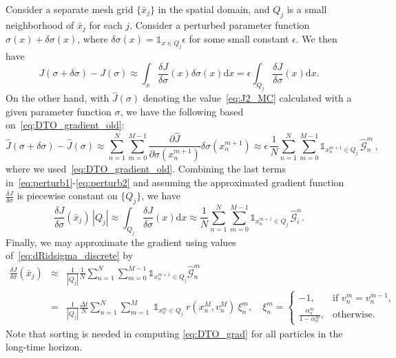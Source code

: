 \documentclass[12pt]{amsart}
\newcommand{\rd}{\mathrm{d}}
\begin{document}
Consider a separate mesh grid $\{\bar{x}_j\}$ in the spatial domain, and $Q_j$ is a small neighborhood of $\bar{x}_j$ for each $j$. Consider a perturbed parameter function $\sigma(x) + \delta \sigma(x)$, where $\delta \sigma(x) = \mathds{1}_{x \in Q_j}  \epsilon$ for some small constant $\epsilon$. We then have
\begin{equation}\label{eq:perturb1}
J(\sigma  +\delta \sigma ) - J(\sigma) \approx \int_x \frac{\delta J}{\delta \sigma}(x) \delta \sigma(x) \rd{x} = \epsilon  \int_{Q_j} \frac{\delta J}{\delta \sigma}(x) \rd{x}.
\end{equation}
On the other hand, with $\hat{J}(\sigma)$ denoting the value~\eqref{eq:J2_MC} calculated with a given parameter function $\sigma$, we have the following based on~\eqref{eq:DTO_gradient_old}:
\begin{equation}\label{eq:perturb2}
\hat{J}(\sigma  +\delta \sigma ) -  \hat{J}(\sigma) \approx  \sum_{n=1}^N \sum_{m=0}^{M-1}  \frac{\partial \hat{J} }{\partial \sigma(x_n^{m+1})} \delta \sigma(x_n^{m+1})  \approx 
\epsilon\,  \frac{1}{N} \sum_{n=1}^N \sum_{m=0}^{M-1}  \mathds{1}_{x_n^{m+1} \in Q_j} \,  \widehat{\mathcal{G}}_n^m\,,
\end{equation}
where we used~\eqref{eq:DTO_gradient_old}. Combining the last terms in~\eqref{eq:perturb1}-\eqref{eq:perturb2} and assuming the approximated gradient function $\frac{\delta J}{\delta \sigma}$ is piecewise constant on $\{Q_j\}$, we have 
\[
 \frac{\delta J}{\delta \sigma}(\bar x_j)\, |Q_j| \approx \int_{Q_j} \frac{\delta J}{\delta \sigma}(x) \rd{x} \approx \frac{1}{N} \sum_{n=1}^N \sum_{m=0}^{M-1}  \mathds{1}_{x_n^{m+1} \in Q_j} \, \widehat{\mathcal{G}}_i^n.
\]
Finally, we may approximate the gradient using values of~\eqref{eq:dRidsigma_discrete} by
\begin{eqnarray}
 \frac{\delta J}{\delta \sigma}(\bar x_j)  & \approx& \frac{1}{|Q_j|}  \frac{1}{N}  \sum_{n=1}^N \sum_{m=0}^{M-1}  \mathds{1}_{x_n^{m+1} \in Q_j}   \widehat{\mathcal{G}}_n^m\nonumber
 \\
 &=&\frac{1}{|Q_j|} \frac{ \Delta t}{N}\sum_{n=1}^N\sum_{m=1}^{M} \ \mathds{1}_{x_n^{m} \in Q_j} \  r(x_n^M, v_n^M) \ \xi_n^m,\quad \xi_n^m = \begin{cases}
 -1 , & \text{if\ }  v_n^{m} = v_n^{m-1}, \\
 \frac{\alpha_n^m}{1 - \alpha_n^m } , &\text{otherwise}.
 \end{cases} \label{eq:DTO_grad}
\end{eqnarray}
Note that sorting is needed in computing \eqref{eq:DTO_grad} for all particles in the long-time horizon.
\end{document}
